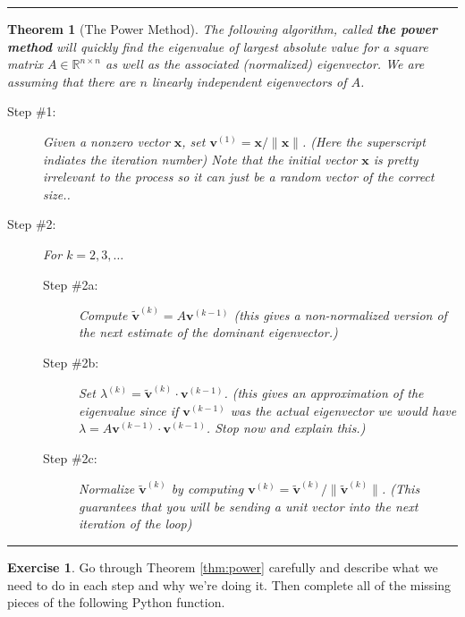 \documentclass[
]{book}
\newtheorem{theorem}{Theorem}[chapter]
\theoremstyle{definition}
\theoremstyle{definition}
\theoremstyle{definition}
\newtheorem{exercise}{Exercise}[chapter]
\theoremstyle{remark}
\begin{document}
\begin{center}\rule{0.5\linewidth}{0.5pt}\end{center}

\begin{theorem}[The Power Method]
\protect\hypertarget{thm:power}{}{\label{thm:power} {} }The following algorithm, called \textbf{the power method} will quickly find the eigenvalue of largest absolute value for a square matrix \(A \in \mathbb{R}^{n \times n}\) as well as the associated (normalized) eigenvector. We are assuming that there are \(n\) linearly independent eigenvectors of \(A\).

\begin{description}
\item[Step \#1:]
Given a nonzero vector \(\boldsymbol{x}\), set \(\boldsymbol{v}^{(1)} = \boldsymbol{x} / \|\boldsymbol{x}\|\). (Here
the superscript indiates the iteration number) Note that the initial vector \(\boldsymbol{x}\) is pretty irrelevant to the process so it can just be a random vector of the correct size..
\item[Step \#2:]
For \(k=2, 3, \ldots\)

\begin{description}
\item[Step \#2a:]
Compute \(\tilde{\boldsymbol{v}}^{(k)} = A \boldsymbol{v}^{(k-1)}\) (this gives a
non-normalized version of the next estimate of the dominant
eigenvector.)
\item[Step \#2b:]
Set \(\lambda^{(k)} = \tilde{\boldsymbol{v}}^{(k)} \cdot  \boldsymbol{v}^{(k-1)}\). (this gives an
approximation of the eigenvalue since if \(\boldsymbol{v}^{(k-1)}\) was the
actual eigenvector we would have
\(\lambda = A \boldsymbol{v}^{(k-1)} \cdot \boldsymbol{v}^{(k-1)}\). Stop now and explain this.)
\item[Step \#2c:]
Normalize \(\tilde{\boldsymbol{v}}^{(k)}\) by computing \(\boldsymbol{v}^{(k)} =  \tilde{\boldsymbol{v}}^{(k)} / \| \tilde{\boldsymbol{v}}^{(k)} \|\).
(This guarantees that you will be sending a unit vector into the
next iteration of the loop)
\end{description}
\end{description}
\end{theorem}

\begin{center}\rule{0.5\linewidth}{0.5pt}\end{center}

\begin{exercise}
\protect\hypertarget{exr:unnamed-chunk-367}{}{\label{exr:unnamed-chunk-367} }Go through Theorem \ref{thm:power} carefully and describe what we need to do in each step and why we're doing it. Then complete all of the missing pieces of the following Python function.
\end{exercise}
\end{document}

